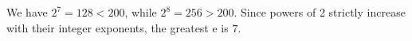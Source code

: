 We have $2^7=128<200$, while $2^8=256>200$. Since powers of 2 strictly increase with their integer exponents, the greatest e is $\boxed 7$.
